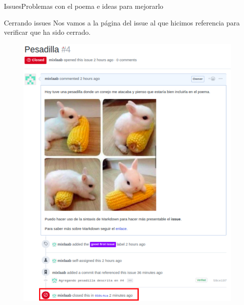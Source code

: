 \documentclass[10pt]{beamer}
\begin{document}
\begin{frame}{Issues}{Problemas con el poema e ideas para mejorarlo}

\begin{block}{Cerrando issues}
Nos vamos a la página del issue al que hicimos referencia para verificar que ha sido cerrado.
\vspace{-0.1in}
\begin{figure}[h!]
\centering
\includegraphics [scale=0.33]{closeissue4}
\label{fig:first}
\end{figure}
    
\end{block}

\end{frame}
\end{document}
